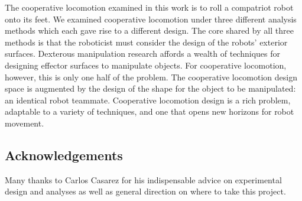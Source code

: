 \documentclass[letterpaper, 10 pt, conference]{ieeeconf}
\begin{document}
The cooperative locomotion examined in this work is to roll a compatriot robot onto its feet.
We examined cooperative locomotion under three different analysis methods which each gave rise to a different design.
The core shared by all three methods is that the roboticist must consider the design of the robots' exterior surfaces.
Dexterous manipulation research affords a wealth of techniques for designing effector surfaces to manipulate objects.
For cooperative locomotion, however, this is only one half of the problem.
The cooperative locomotion design space is augmented by the design of the shape for the object to be manipulated: an identical robot teammate.
Cooperative locomotion design is a rich problem, adaptable to a variety of techniques, and one that opens new horizons for robot movement.

\subsection{Acknowledgements}
Many thanks to Carlos Casarez for his indispensable advice on experimental design and analyses as well as general direction on where to take this project.



\end{document}
